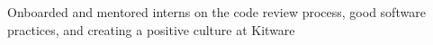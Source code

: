 \documentclass[]{deedy-resume-openfont}
\begin{document}
\begin{minipage}[t]{0.7\textwidth}
\begin{tightemize}
\item Onboarded and mentored interns on the code review process, good software practices, and creating a positive culture at Kitware
\end{tightemize}
\sectionsep








\end{minipage}
\end{document}
